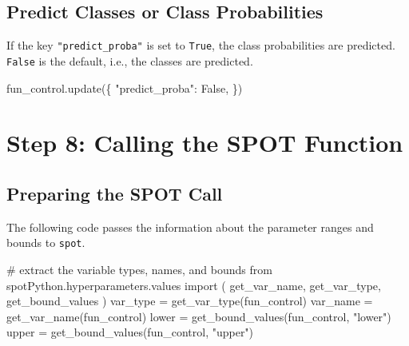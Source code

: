 \documentclass[
  letterpaper,
  DIV=11,
  numbers=noendperiod]{scrreprt}
\newenvironment{Shaded}{\begin{snugshade}}{\end{snugshade}}
\newcommand{\CommentTok}[1]{\textcolor[rgb]{0.37,0.37,0.37}{#1}}
\newcommand{\ImportTok}[1]{\textcolor[rgb]{0.00,0.46,0.62}{#1}}
\newcommand{\NormalTok}[1]{\textcolor[rgb]{0.00,0.23,0.31}{#1}}
\newcommand{\OperatorTok}[1]{\textcolor[rgb]{0.37,0.37,0.37}{#1}}
\newcommand{\StringTok}[1]{\textcolor[rgb]{0.13,0.47,0.30}{#1}}
\newcommand{\VariableTok}[1]{\textcolor[rgb]{0.07,0.07,0.07}{#1}}
\begin{document}
\hypertarget{predict-classes-or-class-probabilities}{%
\subsection{Predict Classes or Class
Probabilities}\label{predict-classes-or-class-probabilities}}

If the key \texttt{"predict\_proba"} is set to \texttt{True}, the class
probabilities are predicted. \texttt{False} is the default, i.e., the
classes are predicted.

\begin{Shaded}
\begin{Highlighting}[]
\NormalTok{fun\_control.update(\{}
               \StringTok{"predict\_proba"}\NormalTok{: }\VariableTok{False}\NormalTok{,}
\NormalTok{               \})}
\end{Highlighting}
\end{Shaded}

\hypertarget{step-8-calling-the-spot-function}{%
\section{Step 8: Calling the SPOT
Function}\label{step-8-calling-the-spot-function}}

\hypertarget{sec-prepare-spot-call-10}{%
\subsection{Preparing the SPOT Call}\label{sec-prepare-spot-call-10}}

The following code passes the information about the parameter ranges and
bounds to \texttt{spot}.

\begin{Shaded}
\begin{Highlighting}[]
\CommentTok{\# extract the variable types, names, and bounds}
\ImportTok{from}\NormalTok{ spotPython.hyperparameters.values }\ImportTok{import}\NormalTok{ (    }
\NormalTok{    get\_var\_name,}
\NormalTok{    get\_var\_type,}
\NormalTok{    get\_bound\_values}
\NormalTok{    )}
\NormalTok{var\_type }\OperatorTok{=}\NormalTok{ get\_var\_type(fun\_control)}
\NormalTok{var\_name }\OperatorTok{=}\NormalTok{ get\_var\_name(fun\_control)}
\NormalTok{lower }\OperatorTok{=}\NormalTok{ get\_bound\_values(fun\_control, }\StringTok{"lower"}\NormalTok{)}
\NormalTok{upper }\OperatorTok{=}\NormalTok{ get\_bound\_values(fun\_control, }\StringTok{"upper"}\NormalTok{)}
\end{Highlighting}
\end{Shaded}
\end{document}
